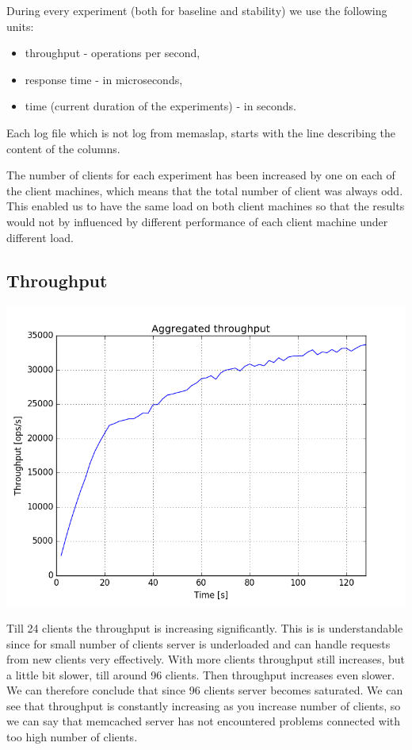 \documentclass[11pt]{article}
\begin{document}
During every experiment (both for baseline and stability) we use the following units:
\begin{itemize}
\item throughput - operations per second,
\item response time - in microseconds,
\item time (current duration of the experiments) - in seconds.
\end{itemize}
Each log file which is not log from memaslap, starts with the line describing the content of the columns.

The number of clients for each experiment has been increased by one on each of the client machines, which means that the total number of client was always odd. This enabled us to have the same load on both client machines so that the results would not by influenced by different performance of each client machine under different load. 

\subsection{Throughput}\label{sec:baseline:tput}
\includegraphics[scale=0.7]{baseline_throughput.png}
\medskip

Till 24 clients the throughput is increasing significantly. This is is understandable since for small number of clients server is underloaded and can handle requests from new clients very effectively. With more clients throughput still increases, but a little bit slower, till around 96 clients. Then throughput increases even slower. We can therefore conclude that since 96 clients server becomes saturated. We can see that throughput is constantly increasing as you increase number of clients, so we can say that memcached server has not encountered problems connected with too high number of clients.
\end{document}
